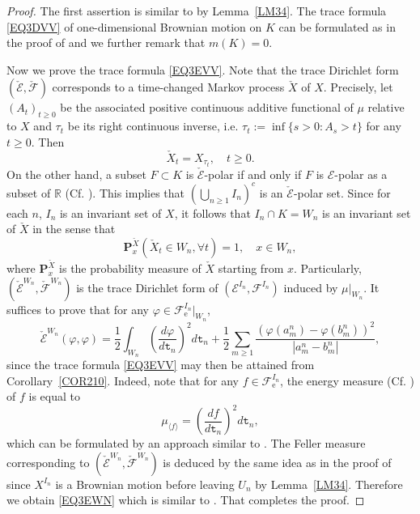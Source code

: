 \documentclass[a4paper]{amsart}
\theoremstyle{definition}
\theoremstyle{remark}
\numberwithin{equation}{section}
\begin{document}
\begin{proof}
The first assertion is similar to \cite[Theorem~2.1~(1)]{LY14} by Lemma~\ref{LM34}. The trace formula \eqref{EQ3DVV} of one-dimensional Brownian motion on $K$ can be formulated as in the proof of \cite[Theorem~2.1~(2)]{LY14} and we further remark that $m(K)=0$.

Now we prove the trace formula \eqref{EQ3EVV}. Note that the trace Dirichlet form $(\check{{\mathcal{E}}},\check{{\mathcal{F}}})$ corresponds to a time-changed Markov process $\check{X}$ of $X$. Precisely, let $(A_t)_{t\geq 0}$ be the associated positive continuous additive functional of $\mu$ relative to $X$ and $\tau_t$ be its right continuous inverse, i.e. $\tau_t:=\inf\{s>0: A_s>t\}$ for any $t\geq 0$. Then
\[
	\check{X}_t=X_{\tau_t}, \quad t\geq 0.
\]
On the other hand, a subset $F\subset K$ is $\check{{\mathcal{E}}}$-polar if and only if $F$ is ${{\mathcal{E}}}$-polar as a subset of $\mathbb{R}$ (Cf. \cite[Theorem~5.2.8]{CF12}). This implies that $(\bigcup_{n\geq 1}I_n)^c$ is an $\check{{\mathcal{E}}}$-polar set. Since for each $n$, $I_n$ is an invariant set of $X$, it follows that $I_n\cap K=W_n$ is an invariant set of $\check{X}$ in the sense that
\[
	\mathbf{P}^{\check{X}}_x(\check{X}_t\in W_n, \forall t)=1, \quad x\in W_n,
\]
where $\mathbf{P}^{\check{X}}_x$ is the probability measure of $\check{X}$ starting from $x$. Particularly, $(\check{{\mathcal{E}}}^{W_n}, \check{{\mathcal{F}}}^{W_n})$ is the trace Dirichlet form of $({{\mathcal{E}}}^{I_n},{{\mathcal{F}}}^{I_n})$ induced by $\mu|_{W_n}$. It suffices to prove that for any $\varphi\in {{\mathcal{F}}}^{I_n}_\mathrm{e}|_{W_n}$,
\begin{equation}\label{EQ3EWN}
	 \check{{\mathcal{E}}}^{W_n}(\varphi,\varphi)=\frac{1}{2}\int_{W_n}\left(\frac{d\varphi}{d{{\mathtt{t}}}_n}\right)^2d{{\mathtt{t}}}_n+\frac{1}{2}\sum_{m\geq 1}\frac{(\varphi(a_m^n)-\varphi(b^n_m))^2}{|a_m^n-b_m^n|},
\end{equation}
since the trace formula \eqref{EQ3EVV} may then be attained from Corollary~\ref{COR210}. Indeed, note that for any $f\in {{\mathcal{F}}}^{I_n}_\mathrm{e}$, the energy measure (Cf. \cite[(4.3.8)]{CF12}) of $f$ is equal to
\[
	\mu_{\langle f\rangle}=\left(\frac{df}{d{{\mathtt{t}}}_n}\right)^2d{{\mathtt{t}}}_n,
\]
which can be formulated by an approach similar to \cite[(2.2)]{LY14}. The Feller measure corresponding to $(\check{{\mathcal{E}}}^{W_n}, \check{{\mathcal{F}}}^{W_n})$ is deduced by the same idea as in the proof of \cite[Theorem~2.1]{LY14} since $X^{I_n}$ is a Brownian motion before leaving $U_n$ by Lemma~\ref{LM34}. Therefore we obtain \eqref{EQ3EWN} which is similar to \cite[Theorem~2.1]{LY14}. That completes the proof.
\end{proof}
\end{document}
